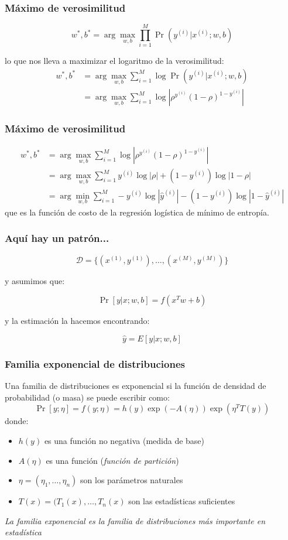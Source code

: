 \documentclass{beamer}
\begin{document}
\begin{frame}
  \frametitle{Máximo de verosimilitud}
  $$
  w^*, b^* = \arg \max_{w, b} \prod_{i=1}^M \Pr(y^{(i)} | x^{(i)}; w, b)
  $$

  lo que nos lleva a maximizar el logaritmo de la verosimilitud:
  \begin{align*}
    w^*, b^* &= \arg \max_{w, b} \sum_{i=1}^M \log \Pr(y^{(i)} | x^{(i)}; w, b) \\
    &= \arg \max_{w, b} \sum_{i=1}^M \log \left|\rho^{y^{(i)}} (1 - \rho)^{1 - y^{(i)}}\right| 
  \end{align*}
\end{frame}

\begin{frame}
  \frametitle{Máximo de verosimilitud}
  \begin{align*}
    w^*, b^* &= \arg \max_{w, b} \sum_{i=1}^M \log \left|\rho^{y^{(i)}} (1 - \rho)^{1 - y^{(i)}}\right| \\
    &= \arg \max_{w, b} \sum_{i=1}^M y^{(i)} \log|\rho| + (1 - y^{(i)}) \log|1 - \rho| \\
    &= \arg \min_{w, b} \sum_{i=1}^M -y^{(i)} \log|\hat{y}^{(i)}| - (1 - y^{(i)}) \log|1 - \hat{y}^{(i)}| 
  \end{align*}
  que es la función de costo de la regresión logística de mínimo de entropía.
\end{frame}

\begin{frame}
  \frametitle{Aquí hay un patrón...}

  $$  
  \mathcal{D} = \{(x^{(1)}, y^{(1)}), \ldots, (x^{(M)}, y^{(M)})\} 
  $$
    
  y asumimos que:
  
  $$
  \Pr[y | x; w, b] = f(x^T w + b)
  $$

  y la estimación la hacemos encontrando:

  $$
  \hat{y} = E[y | x; w, b]
  $$
\end{frame}

\begin{frame}
  \frametitle{Familia exponencial de distribuciones}

  Una familia de distribuciones es exponencial si la función de densidad de probabilidad (o masa) se puede escribir como:
  $$
  \Pr[y; \eta] = f(y; \eta) = h(y) \exp(-A(\eta)) \exp(\eta^T T(y))
  $$
  donde:
  \begin{itemize}
    \item $h(y)$ es una función no negativa (medida de base)
    \item $A(\eta)$ es una función (\emph{función de partición})
    \item $\eta = (\eta_1, \ldots, \eta_n)$ son los parámetros naturales
    \item $T(x) = (T_1(x), \ldots, T_n(x)$ son las estadísticas suficientes
  \end{itemize}

  \begin{block}{}
    \emph{La familia exponencial es la familia de distribuciones más importante en estadística}
  \end{block}
\end{frame}
\end{document}
